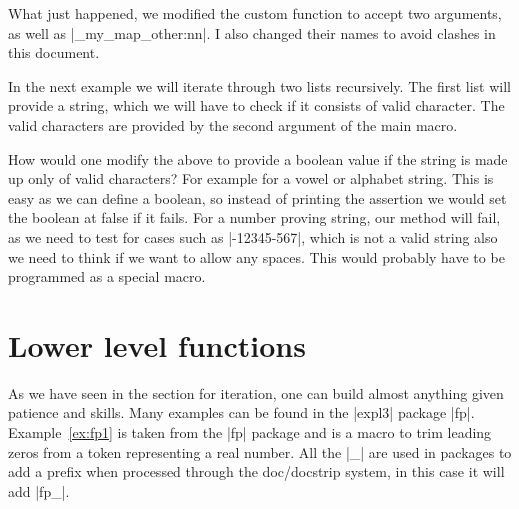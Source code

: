 What just happened, we modified the custom function to accept two arguments, as well as |\_my_map_other:nn|. I also changed  their names to avoid clashes in this document.

In the next example we will iterate through two lists recursively. The first list will provide a string, which we will have to check if it consists of valid character. The valid characters are provided by the second argument of the main macro.



How would one modify the above to provide a boolean value if the string is made up only of valid characters? For example for a vowel or alphabet string. This is easy as we can define a boolean, so instead of printing the assertion we would set the boolean at false if it fails. For a number proving string, our method will fail, as we need to test for cases such as |-12345-567|, which is not a valid string also we need to think if we want to allow any spaces. This would probably have to be programmed as a special macro.

\section{Lower level functions}

As we have seen in the section for \tex iteration, one can build almost anything given patience and skills. Many examples can be found in the |expl3| package |fp|. Example~\ref{ex:fp1} is taken from the |fp| package and is a macro to trim leading zeros from a token representing a real number. All the |\@@_| are used in packages to add a prefix when processed through the doc/docstrip system, in this case it will add |fp_|.

